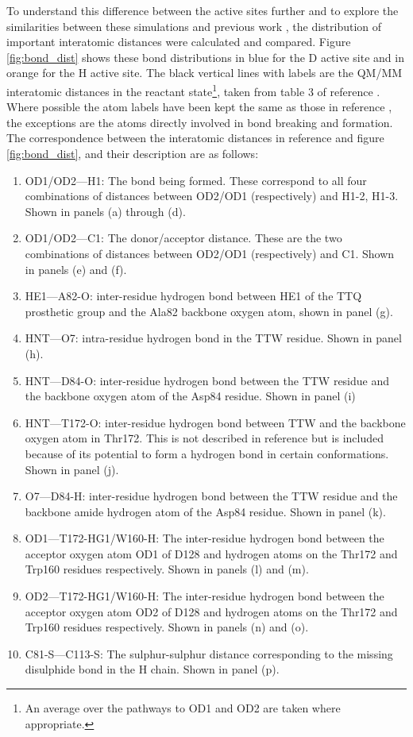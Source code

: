 To understand this difference between the active sites further and to explore the similarities between these simulations and previous work \cite{ranaghanInitioQMMM2017}, the distribution of important interatomic distances were calculated and compared. Figure \ref{fig:bond_dist} shows these bond distributions in blue for the D active site and in orange for the H active site. The black vertical lines with labels are the QM/MM interatomic distances in the reactant state\footnote{An average over the pathways to OD1 and OD2 are taken where appropriate.}, taken from table 3 of reference \cite{ranaghanInitioQMMM2017}. Where possible  the atom labels have been kept the same as those in reference \cite{ranaghanInitioQMMM2017}, the exceptions are the atoms directly involved in bond breaking and formation. The correspondence between the interatomic distances in reference \cite{ranaghanInitioQMMM2017} and figure \ref{fig:bond_dist}, and their description are as follows: 
\begin{enumerate}
    \item OD1/OD2---H1:  The bond being formed. These correspond to all four combinations of distances between OD2/OD1 (respectively) and H1-2, H1-3. Shown in panels (a) through (d). 
    \item OD1/OD2---C1: The donor/acceptor distance. These are the two combinations of distances between OD2/OD1 (respectively) and C1. Shown in panels (e) and (f). 
    \item HE1---A82-O: inter-residue hydrogen bond between HE1 of the TTQ prosthetic group and the Ala82 backbone oxygen atom, shown in panel (g). 
    \item HNT---O7: intra-residue hydrogen bond in the TTW residue. Shown in panel (h).
    \item HNT---D84-O: inter-residue hydrogen bond between the TTW residue and the backbone oxygen atom of the Asp84 residue. Shown in panel (i)
    \item HNT---T172-O: inter-residue hydrogen bond between TTW and the backbone oxygen atom in Thr172. This is not described in reference \cite{ranaghanInitioQMMM2017} but is included because of its potential to form a hydrogen bond in certain conformations. Shown in panel (j). 
    \item O7---D84-H: inter-residue hydrogen bond between the TTW residue and the backbone amide hydrogen atom of the Asp84 residue. Shown in panel (k). 
    \item OD1---T172-HG1/W160-H: The inter-residue hydrogen bond between the acceptor oxygen atom OD1 of D128 and hydrogen atoms on the Thr172 and Trp160 residues respectively. Shown in panels (l) and (m).
    \item OD2---T172-HG1/W160-H: The inter-residue hydrogen bond between the acceptor oxygen atom OD2 of D128 and hydrogen atoms on the Thr172 and Trp160 residues respectively. Shown in panels (n) and (o).\label{o1_t172}
    \item C81-S---C113-S: The sulphur-sulphur distance corresponding to the missing disulphide bond in the H chain. Shown in panel (p). \label{cs_cs} 
\end{enumerate}

